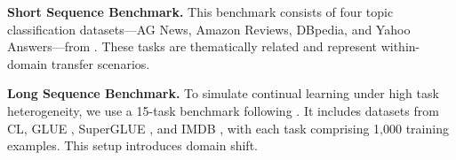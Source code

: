 \documentclass[letterpaper]{article} %
\begin{document}


\textbf{Short Sequence Benchmark.}  
This benchmark consists of four topic classification datasets—AG News, Amazon Reviews, DBpedia, and Yahoo Answers—from \cite{NIPS2015_250cf8b5}. These tasks are thematically related and represent within-domain transfer scenarios.


\textbf{Long Sequence Benchmark.}  
To simulate continual learning under high task heterogeneity, we use a 15-task benchmark following \cite{razdaibiedina2023progressivepromptscontinuallearning}. It includes datasets from CL, GLUE \cite{wang2019gluemultitaskbenchmarkanalysis}, SuperGLUE \cite{NEURIPS2019_4496bf24}, and IMDB \cite{maas2011learning}, with each task comprising 1,000 training examples. This setup introduces domain shift.


\end{document}
